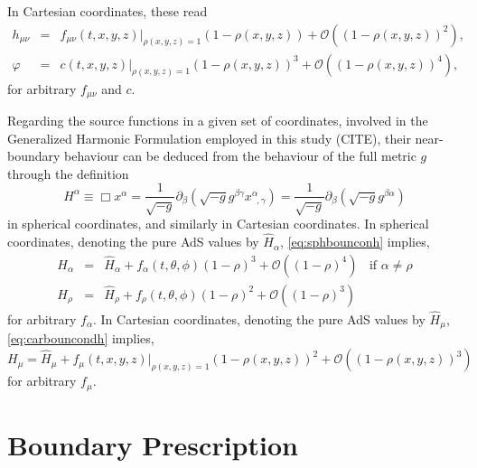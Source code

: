 \documentclass[a4paper,11pt]{article}
\numberwithin{equation}{section}
\begin{document}
In Cartesian coordinates, these read
\begin{eqnarray}
\label{eq:carbouncondh}
h_{\mu\nu}&=&f_{\mu\nu}(t,x,y,z)|_{\rho(x,y,z)=1}(1-\rho(x,y,z))+\mathcal{O}((1-\rho(x,y,z))^{2}), \\
\label{eq:carbouncondphi}
\varphi&=&c(t,x,y,z)|_{\rho(x,y,z)=1}(1-\rho(x,y,z))^3+\mathcal{O}((1-\rho(x,y,z))^{4}), 
\end{eqnarray}
for arbitrary $f_{\mu\nu}$ and $c$.

Regarding the source functions in a given set of coordinates, involved in the Generalized Harmonic Formulation employed in this study (CITE), their near-boundary behaviour can be deduced from the behaviour of the full metric $g$ through the definition 
\begin{equation}\label{eq:defsoufunsph}
H^\alpha \equiv \Box x^\alpha = \frac{1}{\sqrt{-g}}\partial_\beta (\sqrt{-g}g^{\beta\gamma}x^\alpha_{\;\;,\gamma})=\frac{1}{\sqrt{-g}}\partial_\beta (\sqrt{-g}g^{\beta\alpha})
\end{equation}
in spherical coordinates, and similarly in Cartesian coordinates. 
In spherical coordinates, denoting the pure AdS values by $\hat{H}_\alpha$, \eqref{eq:sphbounconh} implies,
\begin{eqnarray}\label{eq:sphbouncondsoufunc}
H_\alpha&=&\hat{H}_\alpha+f_\alpha(t,\theta,\phi)(1-\rho)^3+\mathcal{O}((1-\rho)^4) \;\; \textrm{ if $\alpha\neq\rho$} \\ \nonumber
H_\rho&=&\hat{H}_\rho+f_\rho(t,\theta,\phi)(1-\rho)^2+\mathcal{O}((1-\rho)^3)
\end{eqnarray}
for arbitrary $f_\alpha$.
In Cartesian coordinates,  denoting the pure AdS values by $\hat{H}_\mu$, \eqref{eq:carbouncondh} implies,
\begin{equation}\label{eq:carbouncondsoufun}
H_\mu=\hat{H}_\mu+f_\mu(t,x,y,z)|_{\rho(x,y,z)=1}(1-\rho(x,y,z))^2+\mathcal{O}((1-\rho(x,y,z))^3)
\end{equation}
for arbitrary $f_\mu$.
\fi

\section{Boundary Prescription}\label{sec:pre_sta}
\end{document}
